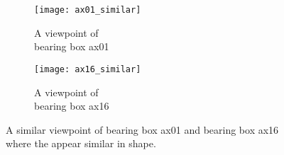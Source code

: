 \documentclass[paper=a4,11pt,parskip=half,toc=listof]{scrartcl}
\begin{document}
\begin{itemize}
\begin{figure}[!htb]
	\centering
	\begin{subfigure}{.3\textwidth}
  		\centering
  		\texttt{[image: ax01\_similar]}
  		\caption{A viewpoint of \\bearing box ax01}
  		\label{Fig:9a}
	\end{subfigure}%
	\begin{subfigure}{.3\textwidth}
  		\centering
  		\texttt{[image: ax16\_similar]}
  		\caption{A viewpoint of \\bearing box ax16}
  		\label{Fig:9b}
	\end{subfigure}%
	\caption{A similar viewpoint of bearing box ax01 and bearing box ax16 where the appear similar in shape.}
	\label{Fig:9}
\end{figure}	
	\end{itemize}
	
\end{document}
